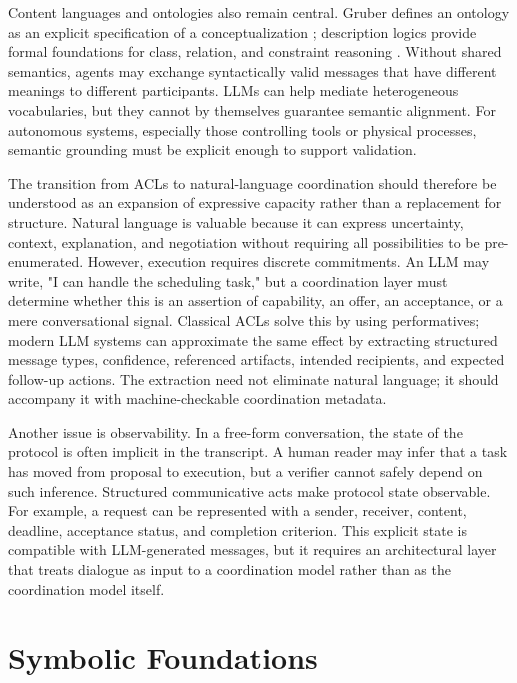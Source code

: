 Content languages and ontologies also remain central. Gruber defines an ontology as an explicit specification of a conceptualization \cite{gruber1993translation}; description logics provide formal foundations for class, relation, and constraint reasoning \cite{baader2003description}. Without shared semantics, agents may exchange syntactically valid messages that have different meanings to different participants. LLMs can help mediate heterogeneous vocabularies, but they cannot by themselves guarantee semantic alignment. For autonomous systems, especially those controlling tools or physical processes, semantic grounding must be explicit enough to support validation.

The transition from ACLs to natural-language coordination should therefore be understood as an expansion of expressive capacity rather than a replacement for structure. Natural language is valuable because it can express uncertainty, context, explanation, and negotiation without requiring all possibilities to be pre-enumerated. However, execution requires discrete commitments. An LLM may write, "I can handle the scheduling task," but a coordination layer must determine whether this is an assertion of capability, an offer, an acceptance, or a mere conversational signal. Classical ACLs solve this by using performatives; modern LLM systems can approximate the same effect by extracting structured message types, confidence, referenced artifacts, intended recipients, and expected follow-up actions. The extraction need not eliminate natural language; it should accompany it with machine-checkable coordination metadata.

Another issue is observability. In a free-form conversation, the state of the protocol is often implicit in the transcript. A human reader may infer that a task has moved from proposal to execution, but a verifier cannot safely depend on such inference. Structured communicative acts make protocol state observable. For example, a request can be represented with a sender, receiver, content, deadline, acceptance status, and completion criterion. This explicit state is compatible with LLM-generated messages, but it requires an architectural layer that treats dialogue as input to a coordination model rather than as the coordination model itself.

\section{Symbolic Foundations}

